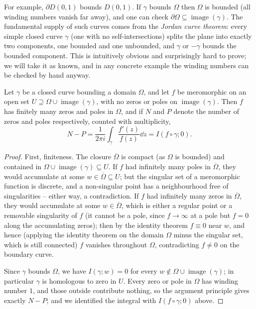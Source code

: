For example, $\partial D(0, 1)$ bounds $D(0, 1)$. If $\gamma$ bounds $\Omega$ then $\Omega$ is bounded (all winding numbers vanish far away), and one can check $\partial \Omega \subseteq \operatorname{image}(\gamma)$. The fundamental supply of such curves comes from the \emph{Jordan curve theorem}: every simple closed curve $\gamma$ (one with no self-intersections) splits the plane into exactly two components, one bounded and one unbounded, and $\gamma$ or $-\gamma$ bounds the bounded component. This is intuitively obvious and surprisingly hard to prove; we will take it as known, and in any concrete example the winding numbers can be checked by hand anyway.

\begin{corollary}
    Let $\gamma$ be a closed curve bounding a domain $\Omega$, and let $f$ be meromorphic on an open set $U \supseteq \Omega \cup \operatorname{image}(\gamma)$, with no zeros or poles on $\operatorname{image}(\gamma)$. Then $f$ has finitely many zeros and poles in $\Omega$, and if $N$ and $P$ denote the number of zeros and poles respectively, counted with multiplicity,
    $$
    N - P = \frac{1}{2 \pi i}\int_\gamma \frac{f'(z)}{f(z)} \dd z = I(f \circ \gamma; 0).
    $$
\end{corollary}
\begin{proof}
    First, finiteness. The closure $\overline{\Omega}$ is compact (as $\Omega$ is bounded) and contained in $\Omega \cup \operatorname{image}(\gamma) \subseteq U$. If $f$ had infinitely many poles in $\overline{\Omega}$, they would accumulate at some $w \in \overline{\Omega} \subseteq U$; but the singular set of a meromorphic function is discrete, and a non-singular point has a neighbourhood free of singularities -- either way, a contradiction. If $f$ had infinitely many zeros in $\overline{\Omega}$, they would accumulate at some $w \in \overline{\Omega}$, which is either a regular point or a removable singularity of $f$ (it cannot be a pole, since $f \rightarrow \infty$ at a pole but $f = 0$ along the accumulating zeros); then by the identity theorem $f \equiv 0$ near $w$, and hence (applying the identity theorem on the domain $\Omega$ minus the singular set, which is still connected) $f$ vanishes throughout $\Omega$, contradicting $f \neq 0$ on the boundary curve.

    Since $\gamma$ bounds $\Omega$, we have $I(\gamma; w) = 0$ for every $w \notin \Omega \cup \operatorname{image}(\gamma)$; in particular $\gamma$ is homologous to zero in $U$. Every zero or pole in $\Omega$ has winding number $1$, and those outside contribute nothing, so the argument principle gives exactly $N - P$; and we identified the integral with $I(f \circ \gamma; 0)$ above.
\end{proof}

